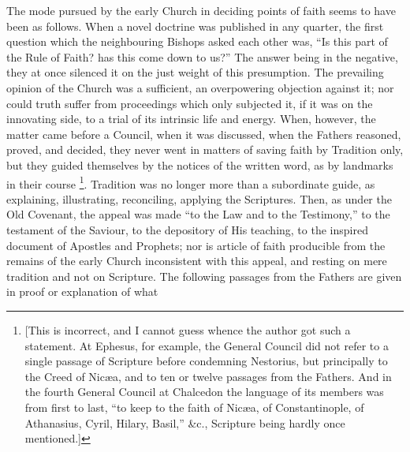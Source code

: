 The mode pursued by the early Church in deciding points of faith
seems to have been as follows. When a novel doctrine was published in
any quarter, the first question which the neighbouring Bishops asked
each other was, ``Is this part of the Rule of Faith? has this come
down to us?'' The answer being in the negative, they at once
silenced it on the just weight of this presumption. The prevailing
opinion of the Church was a sufficient, an overpowering objection
against it; nor could truth suffer from proceedings which only
subjected it, if it was on the innovating side, to a trial of
its intrinsic life and energy. When, however, the matter came before a
Council, when it was discussed, when the Fathers reasoned, proved, and
decided, they never went in matters of saving faith by Tradition only,
but they guided themselves by the notices of the written word, as by
landmarks in their course \footnote{[This is incorrect, and I cannot guess whence the author got
such a statement. At Ephesus, for example, the General Council did not
refer to a single passage of Scripture before condemning Nestorius,
but principally to the Creed of Nicæa, and to ten or twelve passages
from the Fathers. And in the fourth General Council at Chalcedon the
language of its members was from first to last, ``to keep to the
faith of Nicæa, of Constantinople, of Athanasius, Cyril, Hilary,
Basil,'' \&c., Scripture being hardly once mentioned.]}. Tradition was no longer more than
a subordinate guide, as explaining, illustrating, reconciling,
applying the Scriptures. Then, as under the Old Covenant, the appeal
was made ``to the Law and to the Testimony,'' to the testament
of the Saviour, to the depository of His teaching, to the inspired
document of Apostles and Prophets; nor is article of faith producible
from the remains of the early Church inconsistent with this appeal,
and resting on mere tradition and not on Scripture. The following
passages from the Fathers are given in proof or explanation of what
